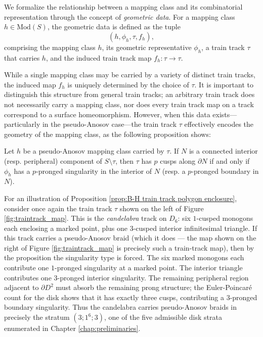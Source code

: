 We formalize the relationship between a mapping class and its combinatorial representation through the concept of \textit{geometric data}. For a mapping class $h \in \mathrm{Mod}(S)$, the geometric data is defined as the tuple
\[
(h, \phi_h, \tau, f_h),
\]
comprising the mapping class $h$, its geometric representative $\phi_h$, a train track $\tau$ that carries $h$, and the induced train track map $f_h: \tau \to \tau$.

While a single mapping class may be carried by a variety of distinct train tracks, the induced map $f_h$ is uniquely determined by the choice of $\tau$. It is important to distinguish this structure from general train tracks; an arbitrary train track does not necessarily carry a mapping class, nor does every train track map on a track correspond to a surface homeomorphism. However, when this data exists---particularly in the pseudo-Anosov case---the train track $\tau$ effectively encodes the geometry of the mapping class, as the following proposition shows:

\begin{prop} \label{prop:B-H train track polygon enclosure}
Let $h$ be a pseudo-Anosov mapping class carried by $\tau$. If $N$ is a connected interior (resp. peripheral) component of $S \setminus \tau$, then $\tau$ has $p$ cusps along $\partial N$ if and only if $\phi_h$ has a $p$-pronged singularity in the interior of $N$ (resp. a $p$-pronged boundary in $N$).
\end{prop}

For an illustration of Proposition \ref{prop:B-H train track polygon enclosure}, consider once again the train track $\tau$ shown on the left of Figure \ref{fig:traintrack_map}. This is the \emph{candelabra} track on $D_6$: six $1$-cusped monogons each enclosing a marked point, plus one $3$-cusped interior infinitesimal triangle. If this track carries a pseudo-Anosov braid (which it does --- the map shown on the right of Figure \ref{fig:traintrack_map} is precisely such a train-track map), then by the proposition the singularity type is forced. The six marked monogons each contribute one $1$-pronged singularity at a marked point. The interior triangle contributes one $3$-pronged interior singularity. The remaining peripheral region adjacent to $\partial D^2$ must absorb the remaining prong structure; the Euler-Poincar\'{e} count for the disk shows that it has exactly three cusps, contributing a $3$-pronged boundary singularity. Thus the candelabra carries pseudo-Anosov braids in precisely the stratum $(3; 1^6; 3)$, one of the five admissible disk strata enumerated in Chapter \ref{chap:preliminaries}.

